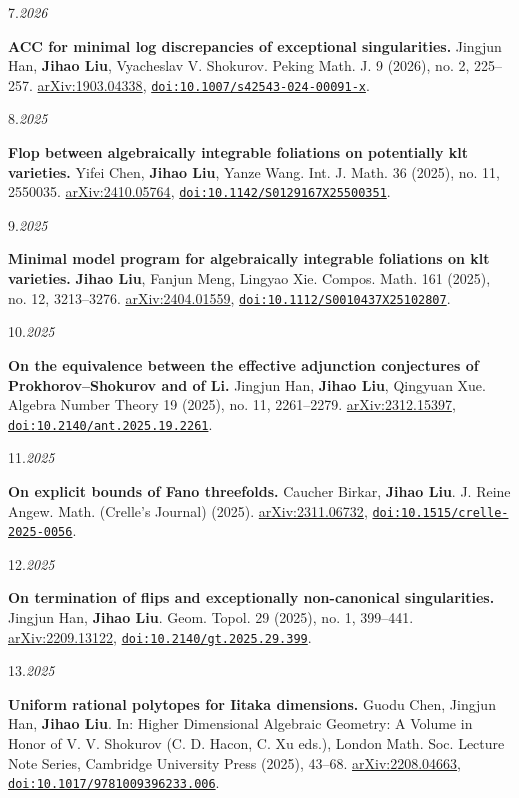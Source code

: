 \documentclass[11pt]{article}
\newlength{\datewidth}
\newcommand{\pubitem}[3]{%
  \noindent
  \begin{minipage}[t]{\datewidth}
    \raggedright\small\color{muted}#1.\;\textit{#2}
  \end{minipage}%
  \hfill%
  \begin{minipage}[t]{\dimexpr\linewidth-\datewidth-0.1in\relax}
    \raggedright #3
  \end{minipage}\par\vspace{4pt}
}
\newcommand{\paper}[1]{\textbf{#1}}
\newcommand{\me}{\textbf{Jihao Liu}}
\newcommand{\idlink}[2]{\href{#1}{\nolinkurl{#2}}}
\begin{document}
\pubitem{7}{2026}{%
  \paper{ACC for minimal log discrepancies of exceptional singularities.}
  Jingjun Han, \me, Vyacheslav V. Shokurov.
  Peking Math. J. 9 (2026), no. 2, 225--257.
  \href{https://arxiv.org/abs/1903.04338}{arXiv:1903.04338}, \idlink{https://doi.org/10.1007/s42543-024-00091-x}{doi:10.1007/s42543-024-00091-x}.}


\pubitem{8}{2025}{%
  \paper{Flop between algebraically integrable foliations on potentially klt varieties.}
  Yifei Chen, \me, Yanze Wang.
  Int. J. Math. 36 (2025), no. 11, 2550035.
  \href{https://arxiv.org/abs/2410.05764}{arXiv:2410.05764}, \idlink{https://doi.org/10.1142/S0129167X25500351}{doi:10.1142/S0129167X25500351}.}


\pubitem{9}{2025}{%
  \paper{Minimal model program for algebraically integrable foliations on klt varieties.}
  \me, Fanjun Meng, Lingyao Xie.
  Compos. Math. 161 (2025), no. 12, 3213--3276.
  \href{https://arxiv.org/abs/2404.01559}{arXiv:2404.01559}, \idlink{https://doi.org/10.1112/S0010437X25102807}{doi:10.1112/S0010437X25102807}.}


\pubitem{10}{2025}{%
  \paper{On the equivalence between the effective adjunction conjectures of Prokhorov--Shokurov and of Li.}
  Jingjun Han, \me, Qingyuan Xue.
  Algebra Number Theory 19 (2025), no. 11, 2261--2279.
  \href{https://arxiv.org/abs/2312.15397}{arXiv:2312.15397}, \idlink{https://doi.org/10.2140/ant.2025.19.2261}{doi:10.2140/ant.2025.19.2261}.}


\pubitem{11}{2025}{%
  \paper{On explicit bounds of Fano threefolds.}
  Caucher Birkar, \me.
  J. Reine Angew. Math. (Crelle's Journal) (2025).
  \href{https://arxiv.org/abs/2311.06732}{arXiv:2311.06732}, \idlink{https://doi.org/10.1515/crelle-2025-0056}{doi:10.1515/crelle-2025-0056}.}


\pubitem{12}{2025}{%
  \paper{On termination of flips and exceptionally non-canonical singularities.}
  Jingjun Han, \me.
  Geom. Topol. 29 (2025), no. 1, 399--441.
  \href{https://arxiv.org/abs/2209.13122}{arXiv:2209.13122}, \idlink{https://doi.org/10.2140/gt.2025.29.399}{doi:10.2140/gt.2025.29.399}.}


\pubitem{13}{2025}{%
  \paper{Uniform rational polytopes for Iitaka dimensions.}
  Guodu Chen, Jingjun Han, \me.
  In: Higher Dimensional Algebraic Geometry: A Volume in Honor of V. V. Shokurov (C. D. Hacon, C. Xu eds.), London Math. Soc. Lecture Note Series, Cambridge University Press (2025), 43--68.
  \href{https://arxiv.org/abs/2208.04663}{arXiv:2208.04663}, \idlink{https://doi.org/10.1017/9781009396233.006}{doi:10.1017/9781009396233.006}.}
\end{document}
